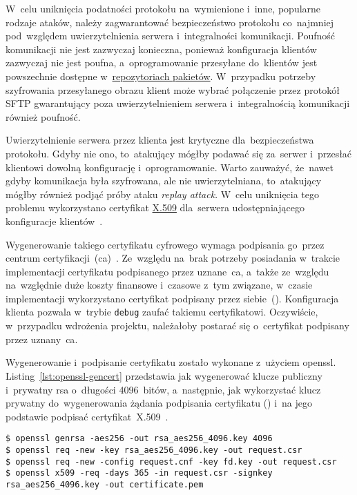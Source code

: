 \documentclass[thesis]{subfiles}
\begin{document}
W~celu uniknięcia podatności protokołu na~wymienione i~inne, popularne rodzaje ataków, należy zagwarantować bezpieczeństwo protokołu co~najmniej pod~względem uwierzytelnienia serwera i~integralności komunikacji. Poufność komunikacji nie jest zazwyczaj konieczna, ponieważ konfiguracja klientów zazwyczaj nie jest poufna, a~oprogramowanie przesyłane do~klientów jest powszechnie dostępne w~\href{https://wiki.archlinux.org/index.php/official_repositories}{repozytoriach pakietów}. W~przypadku potrzeby szyfrowania przesyłanego obrazu klient może wybrać połączenie przez protokół SFTP gwarantujący poza uwierzytelnieniem serwera i~integralnością komunikacji również poufność.

Uwierzytelnienie serwera przez klienta jest krytyczne dla~bezpieczeństwa protokołu. Gdyby nie ono, to~atakujący mógłby podawać się za~serwer i~przesłać klientowi dowolną konfigurację i~oprogramowanie. Warto zauważyć, że~nawet gdyby komunikacja była szyfrowana, ale nie uwierzytelniana, to~atakujący mógłby również podjąć próby ataku \emph{replay attack}. W~celu uniknięcia tego problemu wykorzystano certyfikat \href{https://en.wikipedia.org/wiki/X.509}{X.509} dla~serwera udostępniającego konfiguracje klientów~\cite{wiki:x509}.

Wygenerowanie takiego certyfikatu cyfrowego wymaga podpisania go~przez centrum certyfikacji~(\gls{ca})~\cite{wiki:ca}. Ze~względu na~brak potrzeby posiadania w~trakcie implementacji certyfikatu podpisanego przez uznane~\gls{ca}, a~także ze~względu na~względnie duże koszty finansowe i~czasowe z~tym związane, w~czasie implementacji wykorzystano certyfikat podpisany przez siebie~(). Konfiguracja klienta pozwala w~trybie \texttt{debug} zaufać takiemu certyfikatowi. Oczywiście, w~przypadku wdrożenia projektu, należałoby postarać się o~certyfikat podpisany przez uznany~\gls{ca}.

Wygenerowanie i~podpisanie certyfikatu zostało wykonane z~użyciem \gls{openssl}. Listing~\ref{lst:openssl-gencert} przedstawia jak wygenerować klucze publiczny i~prywatny \gls{rsa} o~długości 4096~bitów, a~następnie, jak wykorzystać klucz prywatny do~wygenerowania żądania podpisania certyfikatu () i~na jego podstawie podpisać certyfikat~X.509~\cite{openssl-cookbook,wiki:csr}.\\%

\begin{lstlisting}[numbers=none,caption={Wygenerowanie i~podpisanie certyfikatu X.509},label=lst:openssl-gencert]
$ openssl genrsa -aes256 -out rsa_aes256_4096.key 4096
$ openssl req -new -key rsa_aes256_4096.key -out request.csr
$ openssl req -new -config request.cnf -key fd.key -out request.csr
$ openssl x509 -req -days 365 -in request.csr -signkey rsa_aes256_4096.key -out certificate.pem
\end{lstlisting}
\end{document}
